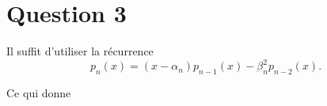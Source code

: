 \section*{Question 3}
Il suffit d'utiliser la récurrence
\[ p_n(x) = (x - \alpha_n)p_{n-1}(x) - \beta_n^2 p_{n-2}(x). \]

Ce qui donne

